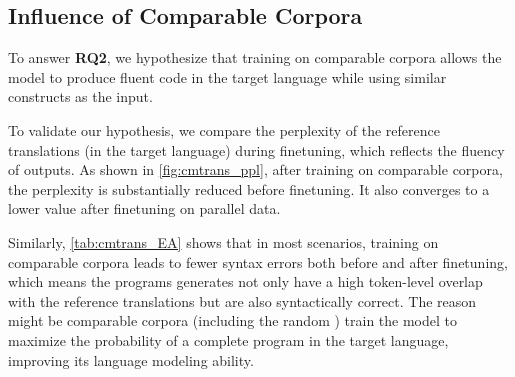 \begin{table}[t]
\centering
{}
\caption{Syntax Accuracy (SA) on TransCoder-test before finetuning, which evaluates whether the program can be compiled without syntax errors.}
\label{tab:cmtrans_EA}
\end{table}



\subsection{Influence of Comparable Corpora}
To answer \textbf{RQ2}, we hypothesize that training on comparable corpora allows the model to produce fluent code in the target language while using similar constructs as the input.


To validate our hypothesis, we compare the perplexity of the reference translations (in the target language) during finetuning, which reflects the fluency of outputs.
As shown in \autoref{fig:cmtrans_ppl}, after training on comparable corpora, the perplexity is substantially reduced before finetuning. It also converges to a lower value after finetuning on parallel data.

Similarly, \autoref{tab:cmtrans_EA} shows that in most scenarios, training on comparable corpora leads to fewer syntax errors both before and after finetuning, which means the programs \cmtransours generates not only have a high token-level overlap with the reference translations but are also syntactically correct.
The reason might be comparable corpora (including the random \CC) train the model to maximize the probability of a complete program in the target language, improving its language modeling ability.



